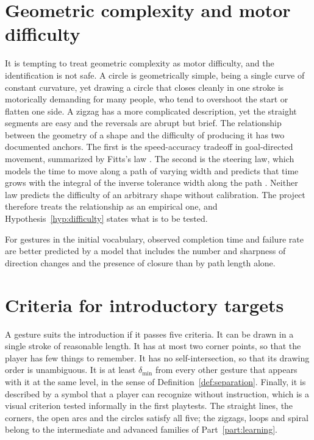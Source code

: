 \section{Geometric complexity and motor difficulty}

It is tempting to treat geometric complexity as motor difficulty, and the identification is not safe. A circle is geometrically simple, being a single curve of constant curvature, yet drawing a circle that closes cleanly in one stroke is motorically demanding for many people, who tend to overshoot the start or flatten one side. A zigzag has a more complicated description, yet the straight segments are easy and the reversals are abrupt but brief. The relationship between the geometry of a shape and the difficulty of producing it has two documented anchors. The first is the speed-accuracy tradeoff in goal-directed movement, summarized by Fitts's law \cite{fitts1954}.\evD{} The second is the steering law, which models the time to move along a path of varying width and predicts that time grows with the integral of the inverse tolerance width along the path \cite{accot1997steering}.\evD{} Neither law predicts the difficulty of an arbitrary shape without calibration. The project therefore treats the relationship as an empirical one, and Hypothesis~\ref{hyp:difficulty} states what is to be tested.

\begin{hypothesis}\label{hyp:difficulty}
For gestures in the initial vocabulary, observed completion time and failure rate are better predicted by a model that includes the number and sharpness of direction changes and the presence of closure than by path length alone.\evH
\end{hypothesis}

\section{Criteria for introductory targets}

A gesture suits the introduction if it passes five criteria. It can be drawn in a single stroke of reasonable length. It has at most two corner points, so that the player has few things to remember. It has no self-intersection, so that its drawing order is unambiguous. It is at least $\delta_{\min}$ from every other gesture that appears with it at the same level, in the sense of Definition~\ref{def:separation}. Finally, it is described by a symbol that a player can recognize without instruction, which is a visual criterion tested informally in the first playtests. The straight lines, the corners, the open arcs and the circles satisfy all five; the zigzags, loops and spiral belong to the intermediate and advanced families of Part~\ref{part:learning}.

